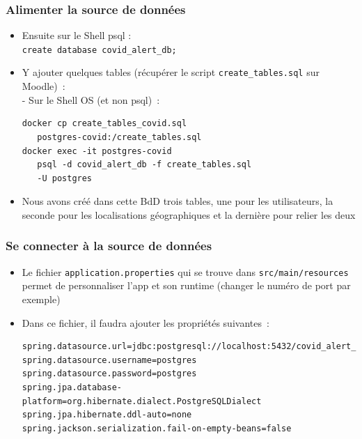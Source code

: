 \documentclass{beamer}
\begin{document}
\begin{frame}[fragile]
	\frametitle{Alimenter la source de données}
	\begin{itemize}	
		\item	Ensuite sur le Shell psql :\\
			\texttt{create database covid\_alert\_db;}
			\item Y ajouter quelques tables (récupérer le script \texttt{create\_tables.sql} sur Moodle)~:\\
			- Sur le Shell OS (et non psql)~:
\begin{verbatim}
docker cp create_tables_covid.sql
   postgres-covid:/create_tables.sql
docker exec -it postgres-covid 
   psql -d covid_alert_db -f create_tables.sql 
   -U postgres
\end{verbatim}

\item[] Nous avons créé dans cette BdD trois tables, une pour les utilisateurs, la seconde pour les localisations géographiques et la dernière pour relier les deux
\end{itemize}
\end{frame} 

\begin{frame}[fragile]
	\frametitle{Se connecter à la source de données}
	\begin{itemize}
		\item Le fichier \texttt{application.properties} qui se trouve dans \texttt{src/main/resources} permet de personnaliser l'app et son runtime (changer le numéro de port par exemple)
		\item Dans ce fichier, il faudra ajouter les propriétés suivantes~:
		\scriptsize
\begin{verbatim}
spring.datasource.url=jdbc:postgresql://localhost:5432/covid_alert_db
spring.datasource.username=postgres
spring.datasource.password=postgres
spring.jpa.database-platform=org.hibernate.dialect.PostgreSQLDialect
spring.jpa.hibernate.ddl-auto=none
spring.jackson.serialization.fail-on-empty-beans=false
\end{verbatim}
\normalsize
	\end{itemize}
\end{frame} 
\end{document}
